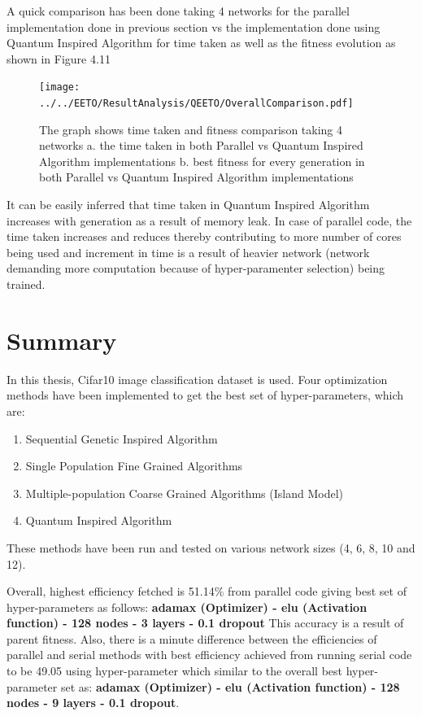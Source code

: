 A quick comparison has been done taking 4 networks for the parallel implementation done in previous section vs the implementation done using Quantum Inspired Algorithm for time taken as well as the fitness evolution as shown in Figure 4.11

\begin{figure}
	\texttt{[image: ../../EETO/ResultAnalysis/QEETO/OverallComparison.pdf]}
	\caption{The graph shows time taken and fitness comparison taking 4 networks \newline a. the time taken in both Parallel vs Quantum Inspired Algorithm implementations \newline b. best fitness for every generation in both Parallel vs Quantum Inspired Algorithm implementations }
\end{figure}


It can be easily inferred that time taken in Quantum Inspired Algorithm increases with generation as a result of memory leak. In case of parallel code, the time taken increases and reduces thereby contributing to more number of cores being used and increment in time is a result of heavier network (network demanding more computation because of hyper-paramenter selection) being trained.




\chapter{Summary}


In this thesis, Cifar10 image classification dataset is used. Four optimization methods have been implemented to get the best set of hyper-parameters, which are:
\begin{enumerate}
	\item Sequential Genetic Inspired Algorithm
	\item Single Population Fine Grained Algorithms
	\item Multiple-population Coarse Grained Algorithms (Island Model)
	\item Quantum Inspired Algorithm
\end{enumerate}


These methods have been run and tested on various network sizes (4, 6, 8, 10 and 12). 

Overall, highest efficiency fetched is 51.14\% from parallel code giving best set of hyper-parameters as follows: \newline \newline \textbf{adamax (Optimizer) - elu (Activation function) - 128 nodes - 3 layers - 0.1 dropout} \newline \newline 
This accuracy is a result of parent fitness. Also, there is a minute difference between the efficiencies of parallel and serial methods with best efficiency achieved from running serial code to be 49.05 using hyper-parameter which similar to the overall best hyper-parameter set as: \newline \newline \textbf{adamax (Optimizer) - elu (Activation function) - 128 nodes - 9 layers - 0.1 dropout}. 

